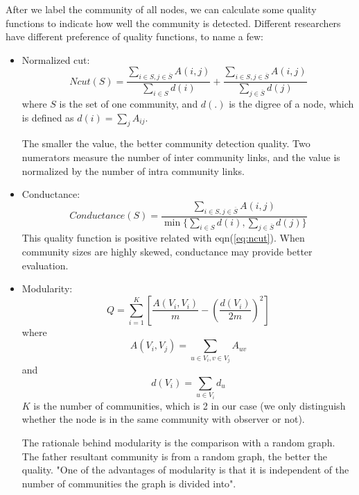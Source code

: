 \documentclass[11pt,a4paper]{article}
\begin{document}
After we label the community of all nodes, we can calculate some quality 
functions to indicate how well the community is detected. Different researchers
have different preference of quality functions, to name a few:
	\begin{itemize}
		\item Normalized cut:
		\begin{equation}
			Ncut(S)=\frac{\sum_{i \in S, j \in \overline{S}}{A(i,j)}}
			{\sum_{i \in S}{d(i)}}
			+ \frac{\sum_{i \in S, j \in \overline{S}}{A(i,j)}}
			{\sum_{j \in \overline{S}}{d(j)}}					
			\label{eq:ncut}	
		\end{equation}
		where $S$ is the set of one community, 
		and $d(.)$ is the digree of a node, which is defined as 
		$d(i)=\sum_j{A_{ij}}$.
		
		The smaller the value, the better community detection quality. 
		Two numerators measure the number of inter community links, 
		and the value is normalized by the number of intra community links. 
		\item Conductance:
		\begin{equation}
			Conductance(S)=\frac{\sum_{i \in S, j \in \overline{S}}{A(i,j)}}
			{\min \{ \sum_{i \in S}{d(i)}, \sum_{j \in \overline{S}}{d(j)}\}}	
			\label{eq:conductance}			
		\end{equation}
		This quality function is positive related with eqn(\ref{eq:ncut}). 
		When community sizes are highly skewed, conductance may provide 
		better evaluation. 
		\item Modularity:
		\begin{equation}
			Q=\sum_{i=1}^{K}{\left[ 
			\frac{A(V_i,V_i)}{m} 
			-\left( \frac{d(V_i)}{2m}\right)^2
			\right]}
			\label{eq:modularity}
		\end{equation}
		where 
		\begin{equation}
			A(V_i,V_j)= \sum_{u \in V_i,v \in V_j}{A_{uv}}
		\end{equation}
		and 
		\begin{equation}
			d(V_i)=\sum_{u \in V_i}{d_u}
		\end{equation}
		$K$ is the number of communities, which is 2 in our case
		(we only distinguish whether the node is in the same community
		with observer or not).
		
		The rationale behind modularity is the comparison with a random 
		graph. The father resultant community is from a random graph, 
		the better the quality. "One of the advantages of modularity is 
		that it is independent of the number of communities the graph is
		divided into"\cite{aggarwal2011social}. 
	\end{itemize}
	
\end{document}
